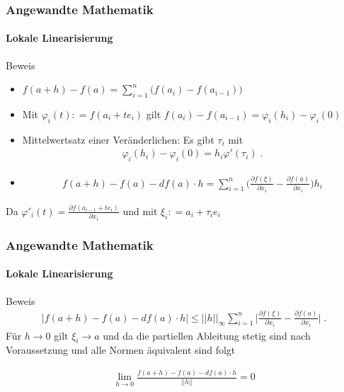 \documentclass{beamer}
\begin{document}
\begin{frame}
    \frametitle{Angewandte Mathematik}
\framesubtitle{Lokale Linearisierung}
    \begin{block}{Beweis}
\begin{itemize}
\item $f(a + h) - f(a) = \sum_{i=1}^{n} \bigl( f (a_i)   - f(a_{i-1})   \bigr)$
\pause \item  Mit $\varphi_i(t) : = f(a_i + t e_i)$ gilt  $f(a_i) - f(a_{i-1}) = \varphi_i(h_i)  - \varphi_i(0)$
\pause \item Mittelwertsatz einer Veränderlichen:  Es gibt  $\tau_i$  mit
\begin{align*}
\varphi_i(h_i)  - \varphi_i(0)  = h_i \varphi'(\tau_i) \;.
\end{align*}
\pause \item 
\begin{align*}
f(a + h) - f(a) - df(a) \cdot h = \sum_{i=1}^n  \biggl( \frac{\partial  f(\xi) }{\partial x_i} -    \frac{\partial  f(a) }{\partial x_i}   \biggr) h_i
\end{align*} 
\end {itemize}

 
Da $\varphi'_i(t) = \frac{\partial  f(a_{i-1} + t e_i ) }{\partial x_i}$ und mit $\xi_i: = a_i + \tau_i e_i$ 
\end{block}

 \end{frame}

\begin{frame}
    \frametitle{Angewandte Mathematik}
\framesubtitle{Lokale Linearisierung}
    \begin{block}{Beweis}
\begin{align*}
| f(a + h) - f(a) - df(a) \cdot h |  \leq || h ||_{\infty}  \sum_{i=1}^n  \biggl| \frac{\partial  f(\xi) }{\partial x_i} -    \frac{\partial  f(a) }{\partial x_i}   \biggr | \; . 
\end{align*} 
Für $h \to 0$ gilt $\xi_i \to a$ und da die partiellen Ableitung stetig sind nach Voraussetzung und alle Normen äquivalent sind folgt

\begin{align*}
\lim_{h \to 0} \frac{ f(a + h) - f(a) - df(a) \cdot h}{||h||} = 0 
\end{align*} 

\end{block}

 \end{frame}
\end{document}
